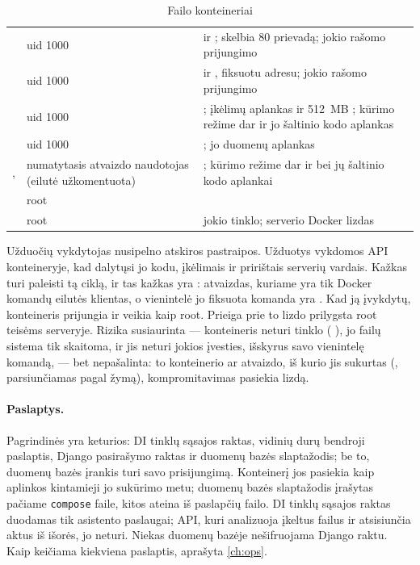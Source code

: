 \begin{table}[H]
\caption{Failo  konteineriai}\label{tab:security:containers}
\begin{tabularx}{\textwidth}{@{}L{38mm}L{27mm}Y@{}}
\toprule
{} &  &  \\
\midrule
{} & uid 1000 &  ir ; skelbia 80 prievadą; jokio rašomo prijungimo \\
 & uid 1000 &  ir , fiksuotu adresu; jokio rašomo prijungimo \\
 & uid 1000 & ; įkėlimų aplankas ir 512~MB ; kūrimo režime dar ir jo šaltinio kodo aplankas \\
 & uid 1000 & ; jo duomenų aplankas \\
,  & numatytasis atvaizdo naudotojas (eilutė  užkomentuota) & ; kūrimo režime dar ir  bei jų šaltinio kodo aplankai \\
 & root &  \\
 & root & jokio tinklo; serverio Docker lizdas \\
\bottomrule
\end{tabularx}
\end{table}

Užduočių vykdytojas nusipelno atskiros pastraipos. Užduotys vykdomos API konteineryje, kad
dalytųsi jo kodu, įkėlimais ir pririštais serverių vardais. Kažkas turi paleisti tą ciklą, ir
tas kažkas yra : atvaizdas, kuriame yra tik Docker komandų eilutės
klientas, o vienintelė jo fiksuota komanda yra  
   . Kad ją įvykdytų,
konteineris prijungia  ir veikia kaip root. Prieiga prie to lizdo
prilygsta root teisėms serveryje. Rizika susiaurinta --- konteineris neturi tinklo
( ), jo failų sistema tik skaitoma, ir jis neturi jokios įvesties,
išskyrus savo vienintelę komandą, --- bet nepašalinta: to konteinerio ar atvaizdo, iš kurio jis
sukurtas (, parsiunčiamas pagal žymą), kompromitavimas pasiekia lizdą.

\paragraph{Paslaptys.} Pagrindinės yra keturios: DI tinklų sąsajos raktas, vidinių durų
bendroji paslaptis, Django pasirašymo raktas ir duomenų bazės slaptažodis; be to, duomenų
bazės įrankis turi savo prisijungimą. Konteinerį jos pasiekia kaip aplinkos kintamieji jo
sukūrimo metu; duomenų bazės slaptažodis įrašytas pačiame \texttt{compose} faile, kitos ateina
iš paslapčių failo. DI tinklų sąsajos raktas duodamas tik asistento paslaugai; API, kuri
analizuoja įkeltus failus ir atsisiunčia aktus iš išorės, jo neturi. Niekas duomenų bazėje
nešifruojama Django raktu. Kaip keičiama kiekviena paslaptis, aprašyta \cref{ch:ops}.


